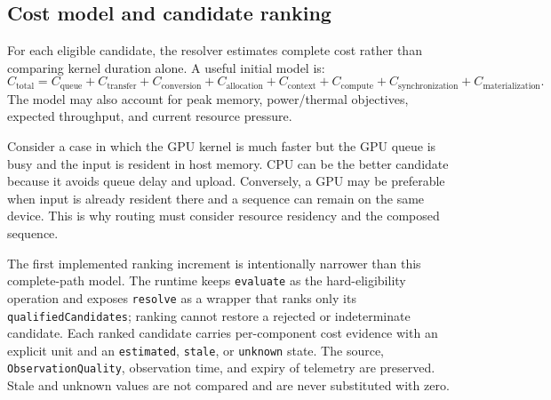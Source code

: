 \documentclass[11pt,a4paper,oneside]{article}
\begin{document}
\subsection{Cost model and candidate ranking}

For each eligible candidate, the resolver estimates complete cost rather than comparing kernel duration alone. A useful initial model is:
\[
  C_{\mathrm{total}} =
  C_{\mathrm{queue}} +
  C_{\mathrm{transfer}} +
  C_{\mathrm{conversion}} +
  C_{\mathrm{allocation}} +
  C_{\mathrm{context}} +
  C_{\mathrm{compute}} +
  C_{\mathrm{synchronization}} +
  C_{\mathrm{materialization}}.
\]
The model may also account for peak memory, power/thermal objectives, expected throughput, and current resource pressure.

Consider a case in which the GPU kernel is much faster but the GPU queue is busy and the input is resident in host memory. CPU can be the better candidate because it avoids queue delay and upload. Conversely, a GPU may be preferable when input is already resident there and a sequence can remain on the same device. This is why routing must consider resource residency and the composed sequence.

The first implemented ranking increment is intentionally narrower than this complete-path model. The runtime keeps \texttt{evaluate} as the hard-eligibility operation and exposes \texttt{resolve} as a wrapper that ranks only its \texttt{qualifiedCandidates}; ranking cannot restore a rejected or indeterminate candidate. Each ranked candidate carries per-component cost evidence with an explicit unit and an \texttt{estimated}, \texttt{stale}, or \texttt{unknown} state. The source, \texttt{ObservationQuality}, observation time, and expiry of telemetry are preserved. Stale and unknown values are not compared and are never substituted with zero.
\end{document}
